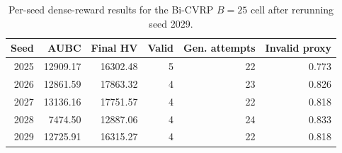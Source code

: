 \begin{table}[H]
\centering
\caption[Dense-reward Bi-CVRP B25 rerun check]{Per-seed dense-reward results for the Bi-CVRP $B=25$ cell after rerunning seed 2029.}
\label{tab:rerun-dense-bicvrp-b25}
\begin{tabular}{rrrrrr}
\toprule
Seed & AUBC & Final HV & Valid & Gen. attempts & Invalid proxy \\
\midrule
2025 & 12909.17 & 16302.48 & 5 & 22 & 0.773 \\
2026 & 12861.59 & 17863.32 & 4 & 23 & 0.826 \\
2027 & 13136.16 & 17751.57 & 4 & 22 & 0.818 \\
2028 & 7474.50 & 12887.06 & 4 & 24 & 0.833 \\
2029 & 12725.91 & 16315.27 & 4 & 22 & 0.818 \\
\bottomrule
\end{tabular}
\end{table}
